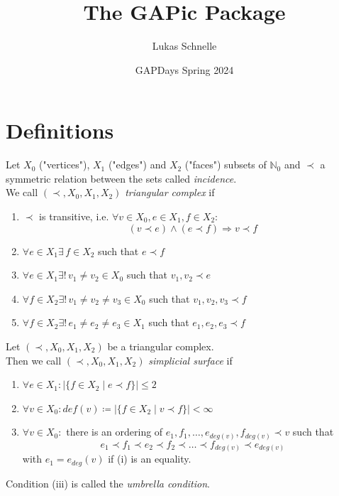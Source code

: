 \documentclass{beamer}
\title{The GAPic Package}
\subtitle{}
\author{Lukas Schnelle}
\date{GAPDays Spring 2024}
\numberwithin{equation}{aufgabe}
\newcommand\N{\mathbb N}
\begin{document}
\frame[plain]{\titlepage}

\section{Definitions}
\begin{frame}
    \begin{definition}\label{def:triangular-comp}
    	Let $X_0$ ("vertices"), $X_1$ ("edges") and $X_2$ ("faces") subsets of $\N_0$ and $\prec$ a symmetric relation between the sets called \emph{incidence}. \pause \\
    	We call $(\prec, X_0, X_1, X_2)$ \emph{triangular complex} if
    	\begin{enumerate}[label=(\roman*)] \pause 
    		\item $\prec$ is transitive, i.e. $\forall v \in X_0, e \in X_1, f \in X_2$:
    		$$(v \prec e) \wedge (e \prec f) \Rightarrow v \prec f$$ \vspace{-15px} \pause
    		\item $\forall e \in X_1 \exists \, f \in X_2$ such that $e \prec f$ \pause 
    		\item \pause $\forall e \in X_1 \exists !\,  v_1 \neq v_2 \in X_0$ such that $v_1, v_2 \prec e$ \pause 
    		\item $\forall f \in X_2 \exists ! \, v_1 \neq v_2 \neq v_3 \in X_0$ such that $v_1, v_2, v_3 \prec f$ \pause 
            \item $\forall f \in X_2 \exists ! \, e_1 \neq e_2 \neq e_3 \in X_1$ such that $e_1, e_2, e_3 \prec f$ \pause 
    	\end{enumerate}
    \end{definition}
\end{frame}

\begin{frame}
    \begin{definition}
        Let $(\prec, X_0, X_1, X_2)$ be a triangular complex.\\
        Then we call $(\prec, X_0, X_1, X_2)$ \emph{simplicial surface} if \pause
        \begin{enumerate}[label=(\roman*)]
            \item $\forall e \in X_1 : | \{ f \in X_2 \mid e \prec f \} | \leq 2 $ 
            \item $\forall v \in X_0 : def(v) \coloneqq | \{ f \in X_2 \mid v \prec f \} | < \infty$ 
            \item $\forall v \in X_0: $ there is an ordering of $e_1, f_1, \dots, e_{deg(v)}, f_{deg(v)} \prec v$ such that 
            $$
                e_1 \prec f_1 \prec e_2 \prec f_2 \prec \dots \prec f_{deg(v)} \prec e_{deg(v)}
            $$
            with $e_1 = e_{deg}(v)$ if (i) is an equality.\pause
        \end{enumerate} 
        Condition (iii) is called the \emph{umbrella condition}.
    \end{definition}
\end{frame}
\end{document}
